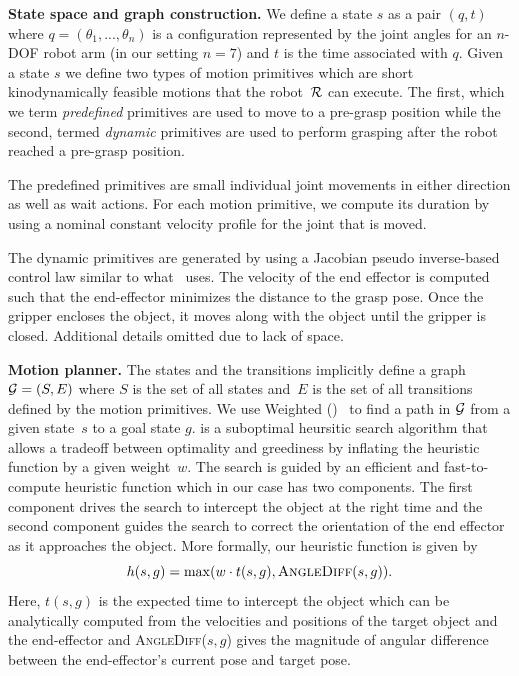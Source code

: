 \documentclass[a4paper,10pt]{article}
\begin{document}
\textbf{State space and graph construction.}
We define a state $s$ as a pair $(q,t)$ where $q = (\theta_1, ..., \theta_n)$ is a configuration represented by the joint angles for an $n$-DOF robot arm (in our setting $n=7$) and $t$ is the time associated with $q$.
%
Given a state $s$ we define two types of motion primitives which are short kinodynamically feasible motions that the robot~$\mathcal{R}$ can execute. The first, which we term \emph{predefined} primitives are used to move to a pre-grasp position while the second, termed \emph{dynamic} primitives are used to perform grasping after the robot reached a pre-grasp position.
%

The predefined primitives are small individual joint movements in either direction as well as wait actions.
For each motion primitive, we compute its duration by using a nominal constant velocity profile for the  joint that is moved.
%

The dynamic primitives are generated by using a Jacobian pseudo inverse-based control law similar to what~\cite{menon2014motion} uses. 
The velocity of the end effector is computed such that the end-effector minimizes the distance to the grasp pose. Once the gripper encloses the object, it moves along with the object until the gripper is closed.
Additional details omitted due to lack of space. 

\textbf{Motion planner.}
The states and the transitions implicitly define a graph $\mathcal{G} = (S,E)$ where $S$ is the set of all states and~$E$ is the set of all transitions defined by the motion primitives. We use Weighted \astar (\wastar)~\cite{pohl1970heuristic} to find a path in $\mathcal{G}$ from a given state~$s$ to a goal state $g$. 
\wastar is a suboptimal heursitic search algorithm that allows a tradeoff between optimality and greediness by inflating the heuristic function by a given weight~$w$. 
The search is guided by an efficient and fast-to-compute heuristic function which in our case has two components.
The first component drives the search to intercept the object at the right time and 
the second component guides the search to correct the orientation of the end effector as it approaches the object. 
More formally, our heuristic function is given by
\vspace{-3mm}
$$
 h(s,g) = \max (w \cdot t(s,g), \textsc{AngleDiff}(s,g)).
$$
Here, $t(s,g)$ is the expected time to intercept the object which can be analytically computed from the velocities and positions of the target object and the end-effector and \textsc{AngleDiff}($s,g$) gives the magnitude of angular difference between the end-effector's current pose and target pose.
\end{document}
